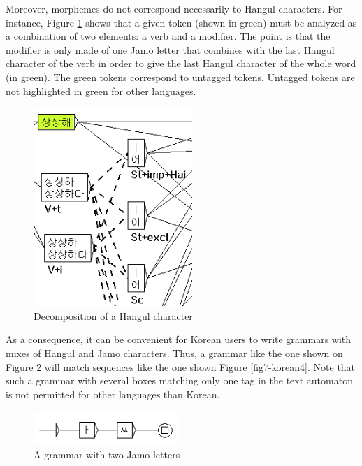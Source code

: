 \noindent Moreover, morphemes do not correspond necessarily to Hangul
characters. For instance, Figure \ref{fig7-korean2} shows that a given token
(shown in green) must be analyzed as a combination of two elements: a verb and
a modifier. The point is that the modifier is only made of one Jamo letter that
combines with the last Hangul character of the verb in order to give the last
Hangul character of the whole word (in green). The green tokens correspond to
untagged tokens. Untagged tokens are not highlighted in green for other
languages.

\begin{figure}[!ht]
\begin{center}
\includegraphics[width=6cm]{resources/img/fig7-korean2.png}
\caption{Decomposition of a Hangul character\label{fig7-korean2}}
\end{center}
\end{figure}

\bigskip
\noindent As a consequence, it can be convenient for Korean users to write
grammars with mixes of Hangul and Jamo characters. Thus, a grammar like the one shown on
Figure \ref{fig7-korean3} will match sequences like the one shown Figure 
\ref{fig7-korean4}. Note that such a grammar with several boxes matching only
one tag in the text automaton is not permitted for other languages than Korean. 

\begin{figure}[!ht]
\begin{center}
\includegraphics[width=5.5cm]{resources/img/fig7-korean3.png}
\caption{A grammar with two Jamo letters\label{fig7-korean3}}
\end{center}
\end{figure}

